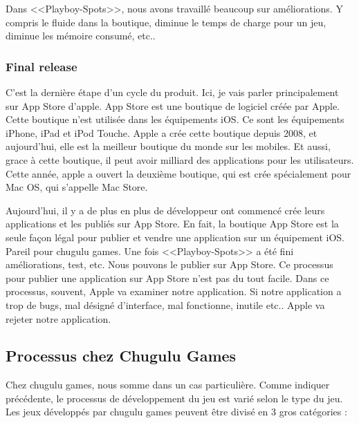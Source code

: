 Dans <<Playboy-Spots>>, nous avons travaillé beaucoup sur améliorations. Y compris le fluide dans la boutique, diminue le temps de charge pour un jeu, diminue les mémoire consumé, etc.. 


\subsubsection{Final release} %
\label{ssub:final_release}

C'est la dernière étape d'un cycle du produit. Ici, je vais parler principalement sur App Store d'apple. App Store est une boutique de logiciel créée par Apple. Cette boutique n'est utilisée dans les équipements iOS. Ce sont les équipements iPhone, iPad et iPod Touche. Apple a crée cette boutique depuis 2008, et aujourd'hui, elle est la meilleur boutique du monde sur les mobiles. Et aussi, grace à cette boutique, il peut avoir milliard des applications pour les utilisateurs. Cette année, apple a ouvert la deuxième boutique, qui est crée spécialement pour Mac OS, qui s'appelle Mac Store. 

Aujourd'hui, il y a de plus en plus de développeur ont commencé crée leurs applications et les publiés sur App Store. En fait, la boutique App Store est la seule façon légal pour publier et vendre une application sur un équipement iOS. Pareil pour chugulu games. Une fois <<Playboy-Spots>> a été fini améliorations, test, etc. Nous pouvons le publier sur App Store. Ce processus pour publier une application sur App Store n'est pas du tout facile. Dans ce processus, souvent, Apple va examiner notre application. Si notre application a trop de bugs, mal désigné d'interface, mal fonctionne, inutile etc.. Apple va rejeter notre application.



\subsection{Processus chez Chugulu Games} %
\label{sub:processus_chez_chugulu_games}

Chez chugulu games, nous somme dans un cas particulière. Comme indiquer précédente, le processus de développement du jeu est varié selon le type du jeu. Les jeux développés par chugulu games peuvent être divisé en 3 gros catégories : 

